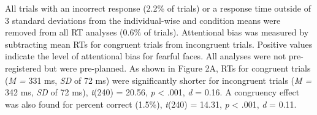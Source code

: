 \documentclass{article}
\begin{document}
	All trials with an incorrect response (2.2\% of trials) or a response time outside of 3 standard deviations from {\color{4472C4}the individual-wise and condition means }were removed from all RT analyses (0.6\% of trials). Attentional bias was measured by subtracting {\color{4472C4}mean} RTs for congruent trials from incongruent trials. Positive values indicate the level of attentional bias for fearful faces. {\color{4472C4}All analyses were not pre-registered but were pre-planned}. As shown in Figure 2A, RTs for congruent trials (\emph{M = }331 ms, \emph{SD} of 72 ms) were significantly shorter for incongruent trials (\emph{M = }342 ms, \emph{SD} of 72 ms), \emph{t}(240) = 20.56, \emph{p} < .001, \emph{d }= 0.16. A congruency effect was also found for percent correct (1.5\%), \emph{t}(240) = 14.31, \emph{p} < .001, \emph{d }= 0.11.
\end{document}
